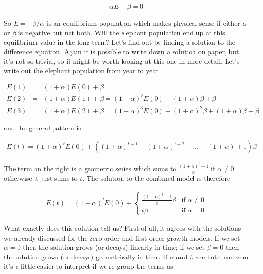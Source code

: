\begin{eqnarray*}
\alpha E + \beta = 0
\end{eqnarray*}

So $E = -\beta /\alpha$ is an equilibrium population which makes physical sense if either $\alpha$ or $\beta$ is negative but not both. Will the elephant population end up at this equilibrium value in the long-term? Let's find out by finding a solution to the difference equation. Again it is possible to write down a solution on paper, but it's not so trivial, so it might be worth looking at this one in more detail. Let's write out the elephant population from year to year

\begin{eqnarray*}
E(1) &=& (1+\alpha)E(0) + \beta \\
E(2) &=& (1+\alpha)E(1) + \beta = (1+\alpha)^2 E(0) + (1+\alpha)\beta + \beta \\
E(3) &=& (1+\alpha)E(2) + \beta = (1+\alpha)^3 E(0) + (1+\alpha)^2 \beta + (1+\alpha)\beta + \beta 
\end{eqnarray*}

and the general pattern is

\begin{eqnarray*}
E(t) = (1+\alpha)^t E(0) + ((1+\alpha)^{t-1} + (1+\alpha)^{t-2} + \ldots + (1+\alpha) + 1) \beta
\end{eqnarray*}

The term on the right is a geometric series which sums to $\frac{(1+\alpha)^t - 1}{\alpha}$ if $\alpha \ne 0$ otherwise it just sums to $t$. The solution to the combined model is therefore

\begin{eqnarray*}
E(t) = (1+\alpha)^t E(0) + \left\{
\begin{array}{cl}
\frac{(1+\alpha)^t - 1}{\alpha} \beta & \mbox{if} \; \alpha \ne 0 \\
t \beta & \mbox{if} \; \alpha = 0
\end{array}
\right.
\end{eqnarray*}

What exactly does this solution tell us? First of all, it agrees with the solutions we already discussed for the zero-order and first-order growth models: If we set $\alpha=0$ then the solution grows (or decays) linearly in time; if we set $\beta=0$ then the solution grows (or decays) geometrically in time. If $\alpha$ and $\beta$ are both non-zero it's a little easier to interpret if we re-group the terms as

